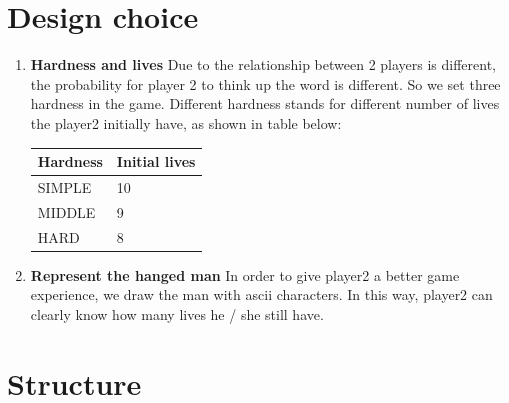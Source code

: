 \documentclass{article}
\begin{document}
    \section{Design choice}
        \begin{enumerate}
            \item \textbf{Hardness and lives}
            Due to the relationship between 2 players is different, the probability for player 2 to think up the word is different. So we set three hardness in the game. Different hardness stands for different number of lives the player2 initially have, as shown in table below:
            
            \begin{table}[h]
                \begin{center}
                    \begin{tabular}{|l|l|}
                        \hline
                        Hardness & Initial lives \\ \hline
                        SIMPLE & 10 \\ \hline
                        MIDDLE & 9 \\ \hline
                        HARD & 8 \\ \hline
                    \end{tabular}
                \end{center}
            \end{table}

            \item \textbf{Represent the hanged man}
                In order to give player2 a better game experience, we draw the man with ascii characters. In this way, player2 can clearly know how many lives he / she still have.
                
        \end{enumerate}

    \newpage

    \section{Structure}
\end{document}
